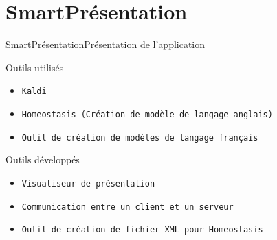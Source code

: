 \documentclass[10pt]{beamer}
\begin{document}

	
\section{SmartPrésentation}
\begin{frame}{SmartPrésentation}{Présentation de l'application}
	\begin{block}{Outils utilisés}
	  	\begin{itemize}
	  		\item {\tt Kaldi}
	  		\item {\tt Homeostasis (Création de modèle de langage anglais)}
	  		\item {\tt Outil de création de modèles de langage français}
		\end{itemize}
	\end{block}	
	
	\begin{block}{Outils développés}
	  	\begin{itemize}
	  		\item {\tt Visualiseur de présentation}
	  		\item {\tt Communication entre un client et un serveur}
	  		\item {\tt Outil de création de fichier XML pour Homeostasis}
		\end{itemize}
	\end{block}		

\end{frame}
\end{document}
